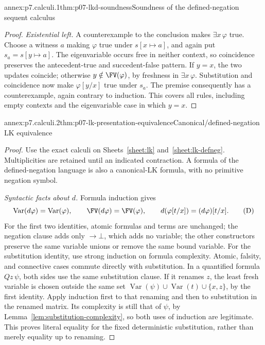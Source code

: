 \begin{annexitem}{annex:p7.calculi.1}{thm:p07-lkd-soundness}{Soundness of the defined-negation sequent calculus}
\begin{proof}
\emph{Existential left.} A counterexample to the conclusion makes
\(\exists x\,\varphi\) true.  Choose a witness \(a\) making
\(\varphi\) true under \(s[x\mapsto a]\), and again put
\(s_a=s[y\mapsto a]\).  The eigenvariable occurs free in neither
context, so coincidence preserves the antecedent-true and
succedent-false pattern.  If \(y=x\), the two updates coincide; otherwise
\(y\notin\FV(\varphi)\), by freshness in \(\exists x\,\varphi\).
Substitution and coincidence now make \(\varphi[y/x]\) true under
\(s_a\).  The premise consequently has a counterexample, again contrary
to induction.  This covers all rules, including empty contexts and the
eigenvariable case in which \(y=x\).
\end{proof}
\end{annexitem}

\begin{annexitem}{annex:p7.calculi.2}{thm:p07-lk-presentation-equivalence}{Canonical/defined-negation LK equivalence}
\begin{proof}
Use the exact calculi on Sheets~\ref{sheet:lk} and~\ref{sheet:lk-defneg}.
Multiplicities are
retained until an indicated contraction.  A formula of the defined-negation
language is also a canonical-LK formula, with no primitive negation symbol.

\emph{Syntactic facts about \(d\).} Formula induction gives
\[
 \operatorname{Var}(d\varphi)=\operatorname{Var}(\varphi),\qquad
 \FV(d\varphi)=\FV(\varphi),\qquad
 d(\varphi[t/x])=(d\varphi)[t/x].
 \tag{D}
\]
For the first two identities, atomic formulas and terms are unchanged;
the negation clause adds only \(\to\bot\), which adds no variable;
the other constructors preserve the same variable unions or remove the
same bound variable.  For the substitution identity, use strong induction
on formula complexity.  Atomic, falsity, and connective cases commute
directly with substitution.  In a quantified formula \(Qz\,\psi\),
both sides use the same substitution clause.  If it renames \(z\), the
least fresh variable is chosen outside the same set
\(\operatorname{Var}(\psi)\cup\operatorname{Var}(t)\cup\{x,z\}\),
by the first identity.  Apply induction first to that renaming and then
to substitution in the renamed matrix.  Its complexity is still that of
\(\psi\), by Lemma~\ref{lem:substitution-complexity}, so both uses of
induction are legitimate.  This proves literal equality for the fixed
deterministic substitution, rather than merely equality up to renaming.


\end{proof}
\end{annexitem}
